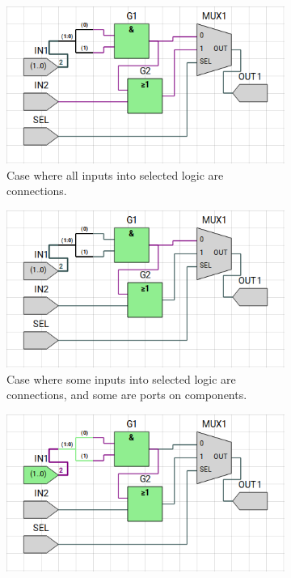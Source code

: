 \bigskip
\begin{figure} [h]
    \begin{subfigure}{0.48\textwidth}
        \centering
        \includegraphics[width=0.8\linewidth]{05.ImpPlan/SelCase1.png}
        \caption{Case where all inputs into selected logic are connections.}
        \label{subfig:SelCase1}
    \end{subfigure}
    \begin{subfigure}{0.48\textwidth}
        \centering
        \includegraphics[width=0.8\linewidth]{05.ImpPlan/SelCase2.png}
        \caption{Case where some inputs into selected logic are connections, and some are ports on components.}
        \label{subfig:SelCase2}
    \end{subfigure}
    \newline
    \begin{subfigure}{0.48\textwidth}
        \centering
        \includegraphics[width=0.8\linewidth]{05.ImpPlan/SelCase3.png}

\end{subfigure}
\end{figure}
